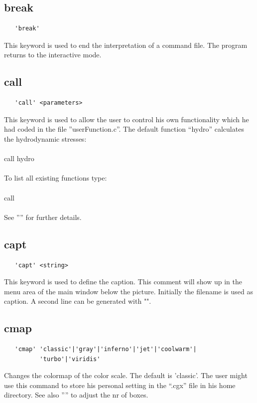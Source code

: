 \documentclass{article}
\begin{document}
\subsection{\label{break}break}
\begin{verbatim}
   'break'
\end{verbatim}
This keyword is used to end the interpretation of a command file. The program returns to the interactive mode.

\subsection{\label{call}call}
\begin{verbatim}
   'call' <parameters>
\end{verbatim}
This keyword is used to allow the user to control his own functionality which he had coded in the file ''userFunction.c''. The default function ``hydro'' calculates the hydrodynamic stresses:\\\\call hydro\\\\To list all existing functions type:\\\\call\\\\See '''' for further details. 

\subsection{\label{capt}capt}
\begin{verbatim}
   'capt' <string> 
\end{verbatim}
This keyword is used to define the caption. This comment will show up in the
menu area of the main window below the picture. Initially the filename is used
as caption. A second line can be generated with "".

\subsection{\label{cmap}cmap}
\begin{verbatim}
   'cmap' 'classic'|'gray'|'inferno'|'jet'|'coolwarm'|
          'turbo'|'viridis'
\end{verbatim}
Changes the colormap of the color scale. The default is 'classic'. The user might use this command to store his personal setting in the ``.cgx'' file in his home directory. See also '''' to adjust the nr of boxes.
\end{document}
